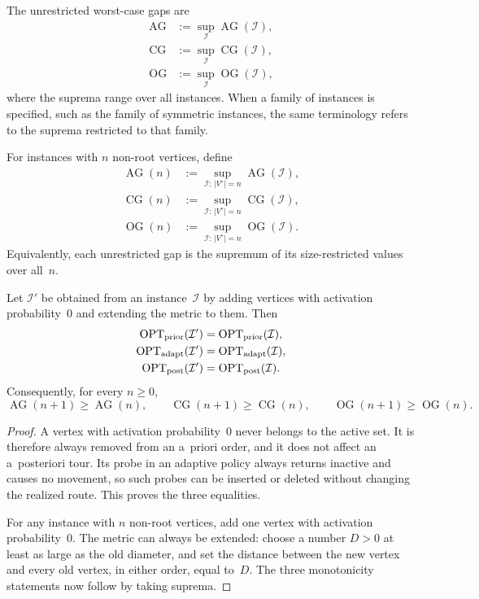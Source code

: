 \documentclass[12pt,a4paper,oneside]{report}
\begin{document}
The unrestricted worst-case gaps are
\begin{align*}
    \operatorname{AG}
    &:=\sup_{\mathcal I}\operatorname{AG}(\mathcal I),\\
    \operatorname{CG}
    &:=\sup_{\mathcal I}\operatorname{CG}(\mathcal I),\\
    \operatorname{OG}
    &:=\sup_{\mathcal I}\operatorname{OG}(\mathcal I),
\end{align*}
where the suprema range over all \StochTSP{} instances. When a family of
instances is specified, such as the family of symmetric instances, the same
terminology refers to the suprema restricted to that family.

For instances with $n$ non-root vertices, define
\begin{align*}
    \operatorname{AG}(n)
    &:=\sup_{\mathcal I:\,|V^\circ|=n}\operatorname{AG}(\mathcal I),\\
    \operatorname{CG}(n)
    &:=\sup_{\mathcal I:\,|V^\circ|=n}\operatorname{CG}(\mathcal I),\\
    \operatorname{OG}(n)
    &:=\sup_{\mathcal I:\,|V^\circ|=n}\operatorname{OG}(\mathcal I).
\end{align*}
Equivalently, each unrestricted gap is the supremum of its size-restricted
values over all~$n$.

\begin{lemma}
\label{lem:zero-probability-vertices}
Let $\mathcal I'$ be obtained from an instance~$\mathcal I$ by adding vertices
with activation probability~$0$ and extending the metric to them. Then
\begin{align*}
    \operatorname{OPT}_\mathrm{prior}(\mathcal I')&=\operatorname{OPT}_\mathrm{prior}(\mathcal I),\\
    \operatorname{OPT}_\mathrm{adapt}(\mathcal I')&=\operatorname{OPT}_\mathrm{adapt}(\mathcal I),\\
    \operatorname{OPT}_\mathrm{post}(\mathcal I')&=\operatorname{OPT}_\mathrm{post}(\mathcal I).
\end{align*}
Consequently, for every $n\ge0$,
\[
    \operatorname{AG}(n+1)\ge\operatorname{AG}(n),\qquad
    \operatorname{CG}(n+1)\ge\operatorname{CG}(n),\qquad
    \operatorname{OG}(n+1)\ge\operatorname{OG}(n).
\]
\end{lemma}

\begin{proof}
A vertex with activation probability~$0$ never belongs to the active set. It
is therefore always removed from an a~priori order, and it does not affect an
a~posteriori tour. Its probe in an adaptive policy always returns inactive
and causes no movement, so such probes can be inserted or deleted without
changing the realized route. This proves the three equalities.

For any instance with $n$ non-root vertices, add one vertex with activation
probability~$0$. The metric can always be extended: choose a number $D>0$ at
least as large as the old diameter, and set the distance between the new
vertex and every old vertex, in either order, equal to~$D$. The three
monotonicity statements now follow by taking suprema.
\end{proof}
\end{document}
